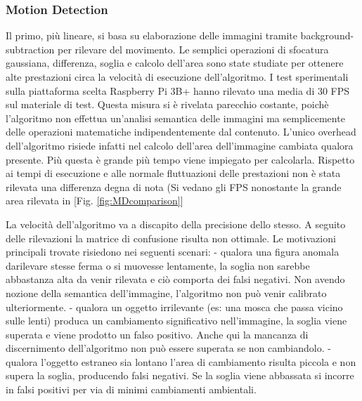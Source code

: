     \subsubsection{Motion Detection} Il primo, più lineare, si basa su elaborazione delle immagini tramite background-subtraction per rilevare del movimento. Le semplici operazioni di sfocatura gaussiana, differenza, soglia e calcolo dell'area sono state studiate per ottenere alte prestazioni circa la velocità di esecuzione dell'algoritmo. 
    I test sperimentali sulla piattaforma scelta Raspberry Pi 3B+ hanno rilevato una media di 30 FPS sul materiale di test. Questa misura si è rivelata parecchio costante, poichè l'algoritmo non effettua un'analisi semantica delle immagini ma semplicemente delle operazioni matematiche indipendentemente dal contenuto. L'unico overhead dell'algoritmo risiede infatti nel calcolo dell'area dell'immagine cambiata qualora presente. Più questa è grande più tempo viene impiegato per calcolarla. Rispetto ai tempi di esecuzione e alle normale fluttuazioni delle prestazioni non è stata rilevata una differenza degna di nota (Si vedano gli FPS nonostante la grande area rilevata in [Fig. \ref{fig:MDcomparison}] 
    
    La velocità dell'algoritmo va a discapito della precisione dello stesso. A seguito delle rilevazioni la matrice di confusione risulta non ottimale. Le motivazioni principali trovate risiedono nei seguenti scenari:
    - qualora una figura anomala darilevare stesse ferma o si muovesse lentamente, la soglia non sarebbe abbastanza alta da venir rilevata e ciò comporta dei falsi negativi. Non avendo nozione della semantica dell'immagine, l'algoritmo non può venir calibrato ulteriormente.
    - qualora un oggetto irrilevante (es: una mosca che passa vicino sulle lenti) produca un cambiamento significativo nell'immagine, la soglia viene superata e viene prodotto un falso positivo. Anche qui la mancanza di discernimento dell'algoritmo non può essere superata se non cambiandolo.
    - qualora l'oggetto estraneo sia lontano l'area di cambiamento risulta piccola e non supera la soglia, producendo falsi negativi. Se la soglia viene abbassata si incorre in falsi positivi per via di minimi cambiamenti ambientali.
    
